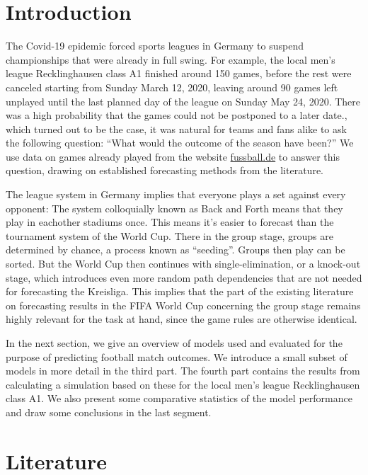 \documentclass[12pt,a4paper]{article}
\begin{document}
\hypertarget{introduction}{%
\section{Introduction}\label{introduction}}

The Covid-19 epidemic forced sports leagues in Germany to suspend
championships that were already in full swing. For example, the local
men's league Recklinghausen class A1 finished around 150 games, before
the rest were canceled starting from Sunday March 12, 2020, leaving
around 90 games left unplayed until the last planned day of the league
on Sunday May 24, 2020. There was a high probability that the games
could not be postponed to a later date., which turned out to be the
case, it was natural for teams and fans alike to ask the following
question: \enquote{What would the outcome of the season have been?} We
use data on games already played from the website
\href{http://www.fussball.de/spielplan/re-kl-a-2-kreis-recklinghausen-kreisliga-a-herren-saison1920-westfalen/-/staffel/027II28DS800000DVS5489B3VS3GHJJU-G\#!/section/matchplan}{fussball.de}
to answer this question, drawing on established forecasting methods from
the literature.

The league system in Germany implies that everyone plays a set against
every opponent: The system colloquially known as Back and Forth means
that they play in eachother stadiums once. This means it's easier to
forecast than the tournament system of the World Cup. There in the group
stage, groups are determined by chance, a process known as
\enquote{seeding}. Groups then play can be sorted. But the World Cup
then continues with single-elimination, or a knock-out stage, which
introduces even more random path dependencies that are not needed for
forecasting the Kreisliga. This implies that the part of the existing
literature on forecasting results in the FIFA World Cup concerning the
group stage remains highly relevant for the task at hand, since the game
rules are otherwise identical.

In the next section, we give an overview of models used and evaluated
for the purpose of predicting football match outcomes. We introduce a
small subset of models in more detail in the third part. The fourth part
contains the results from calculating a simulation based on these for
the local men's league Recklinghausen class A1. We also present some
comparative statistics of the model performance and draw some
conclusions in the last segment.

\hypertarget{literature}{%
\section{Literature}\label{literature}}
\end{document}
